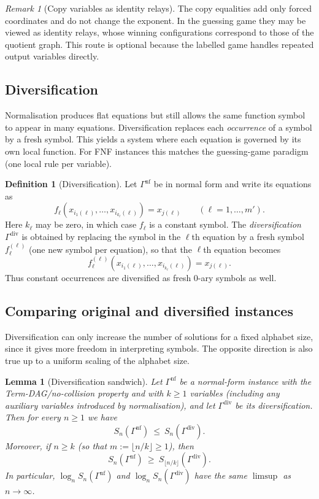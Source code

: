\documentclass[11pt]{article}
\theoremstyle{plain}
\newtheorem{lemma}[theorem]{Lemma}
\theoremstyle{definition}
\theoremstyle{definition}
\newtheorem{definition}[theorem]{Definition}
\theoremstyle{remark}
\newtheorem*{remark*}{Remark}
\newcommand{\Sn}{S_n}
\newcommand{\logn}{\log_n}
\begin{document}
\begin{remark*}[Copy variables as identity relays]
The copy equalities add only forced coordinates and do not change the exponent. In the guessing
game they may be viewed as identity relays, whose winning configurations correspond to those of
the quotient graph. This route is optional because the labelled game handles repeated output
variables directly.
\end{remark*}

\subsection{Diversification}

Normalisation produces flat equations but still allows the same function symbol to appear in many equations.
Diversification replaces each \emph{occurrence} of a symbol by a fresh symbol.
This yields a system where each equation is governed by its own local function.
For FNF instances this matches the guessing-game paradigm (one local rule per variable).

\begin{definition}[Diversification]
\label{def:diversification}
Let $\Gamma^{\mathrm{nf}}$ be in normal form and write its equations as
\[
  f_{\ell}(x_{i_1(\ell)},\dots,x_{i_{k_\ell}(\ell)})=x_{j(\ell)}\qquad (\ell=1,\dots,m').
\]
Here $k_\ell$ may be zero, in which case $f_\ell$ is a constant symbol.
The \emph{diversification} $\Gamma^{\mathrm{div}}$ is obtained by replacing the symbol in the $\ell$th equation
by a fresh symbol $f_\ell^{(\ell)}$ (one new symbol per equation), so that the $\ell$th equation becomes
\[
  f_\ell^{(\ell)}(x_{i_1(\ell)},\dots,x_{i_{k_\ell}(\ell)})=x_{j(\ell)}.
\]
Thus constant occurrences are diversified as fresh $0$-ary symbols as well.
\end{definition}

\subsection{Comparing original and diversified instances}

Diversification can only increase the number of solutions for a fixed alphabet size, since it gives more
freedom in interpreting symbols.
The opposite direction is also true up to a uniform scaling of the alphabet size.

\begin{lemma}[Diversification sandwich]
\label{lem:div-sandwich}
Let $\Gamma^{\mathrm{nf}}$ be a normal-form instance with the Term-DAG/no-collision property and with $k\ge 1$
variables (including any auxiliary variables introduced by normalisation), and let $\Gamma^{\mathrm{div}}$ be its
diversification.
Then for every $n\ge 1$ we have
\[
\Sn(\Gamma^{\mathrm{nf}})\ \le\ \Sn(\Gamma^{\mathrm{div}}).
\]
Moreover, if $n\ge k$ (so that $m:=\lfloor n/k\rfloor\ge 1$), then
\[
\Sn(\Gamma^{\mathrm{nf}})\ \ge\ S_{\lfloor n/k\rfloor}(\Gamma^{\mathrm{div}}).
\]
In particular, $\logn\Sn(\Gamma^{\mathrm{nf}})$ and $\logn\Sn(\Gamma^{\mathrm{div}})$ have the same $\limsup$ as
$n\to\infty$.
\end{lemma}
\end{document}
